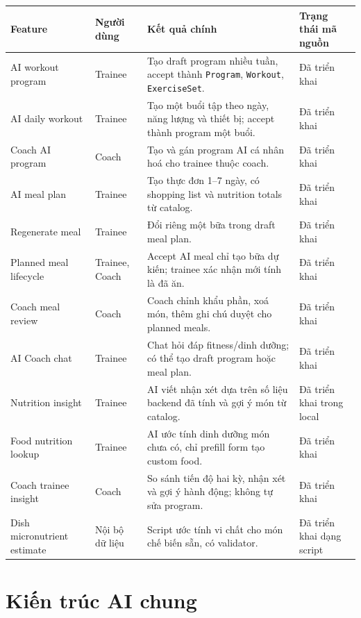 \documentclass[12pt,a4paper]{article}
\newcommand{\code}[1]{\texttt{#1}}
\begin{document}
\begin{longtable}{>{\raggedright\arraybackslash}p{}>{\raggedright\arraybackslash}p{}>{\raggedright\arraybackslash}p{}>{\raggedright\arraybackslash}p{}}
\toprule
\textbf{Feature} & \textbf{Người dùng} & \textbf{Kết quả chính} & \textbf{Trạng thái mã nguồn} \\
\midrule
\endhead
AI workout program & Trainee & Tạo draft program nhiều tuần, accept thành \code{Program}, \code{Workout}, \code{ExerciseSet}. & Đã triển khai \\
AI daily workout & Trainee & Tạo một buổi tập theo ngày, năng lượng và thiết bị; accept thành program một buổi. & Đã triển khai \\
Coach AI program & Coach & Tạo và gán program AI cá nhân hoá cho trainee thuộc coach. & Đã triển khai \\
AI meal plan & Trainee & Tạo thực đơn 1--7 ngày, có shopping list và nutrition totals từ catalog. & Đã triển khai \\
Regenerate meal & Trainee & Đổi riêng một bữa trong draft meal plan. & Đã triển khai \\
Planned meal lifecycle & Trainee, Coach & Accept AI meal chỉ tạo bữa dự kiến; trainee xác nhận mới tính là đã ăn. & Đã triển khai \\
Coach meal review & Coach & Coach chỉnh khẩu phần, xoá món, thêm ghi chú duyệt cho planned meals. & Đã triển khai \\
AI Coach chat & Trainee & Chat hỏi đáp fitness/dinh dưỡng; có thể tạo draft program hoặc meal plan. & Đã triển khai \\
Nutrition insight & Trainee & AI viết nhận xét dựa trên số liệu backend đã tính và gợi ý món từ catalog. & Đã triển khai trong local \\
Food nutrition lookup & Trainee & AI ước tính dinh dưỡng món chưa có, chỉ prefill form tạo custom food. & Đã triển khai \\
Coach trainee insight & Coach & So sánh tiến độ hai kỳ, nhận xét và gợi ý hành động; không tự sửa program. & Đã triển khai \\
Dish micronutrient estimate & Nội bộ dữ liệu & Script ước tính vi chất cho món chế biến sẵn, có validator. & Đã triển khai dạng script \\
\bottomrule
\end{longtable}

\section{Kiến trúc AI chung}
\end{document}
